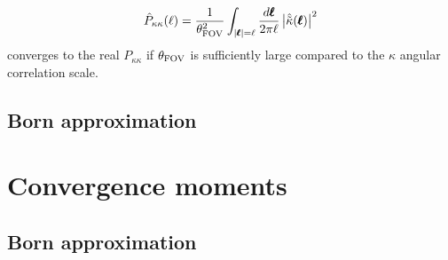 \begin{equation}
\label{eq:4:powerest}
\hat{P}_{\kappa\kappa}(\ell) = \frac{1}{\theta_{\rm FOV}^2}\int_{\vert\pmb{\ell}\vert=\ell}\frac{d\pmb{\ell}}{2\pi\ell}\left\vert\hat{\tilde{\kappa}}(\pmb{\ell})\right\vert^2
\end{equation}
%
converges to the real $P_{\kappa\kappa}$ if $\theta_{\rm FOV}$ is sufficiently large compared to the $\kappa$ angular correlation scale. 



\subsection{Born approximation}


\section{Convergence moments}

\subsection{Born approximation}

